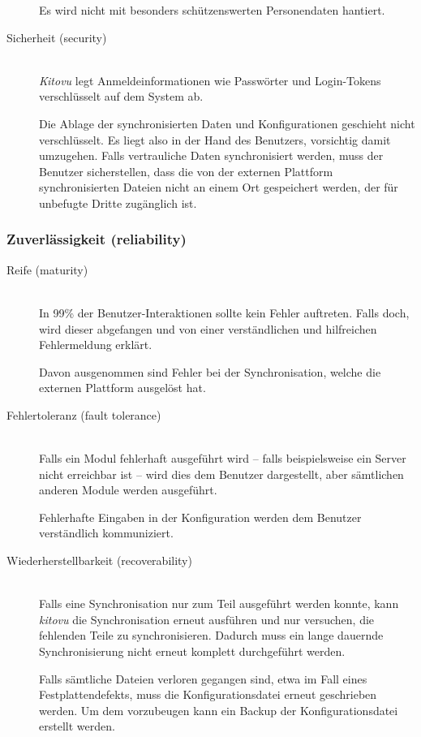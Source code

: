 \documentclass[a4paper]{article}
\begin{document}
\begin{description}
    Es wird nicht mit besonders schützenswerten Personendaten hantiert.
  \item[Sicherheit (security)] \strut \\
    \emph{Kitovu} legt Anmeldeinformationen wie Passwörter und Login-Tokens verschlüsselt auf dem System ab.

    Die Ablage der synchronisierten Daten und Konfigurationen geschieht nicht verschlüsselt. Es liegt also in der Hand des Benutzers, vorsichtig damit umzugehen.
    Falls vertrauliche Daten synchronisiert werden, muss der Benutzer sicherstellen, dass die von der externen Plattform synchronisierten Dateien nicht an einem Ort gespeichert werden, der für unbefugte Dritte zugänglich ist.
\end{description}

\subsubsection{Zuverlässigkeit (reliability)}

\begin{description}
  \item[Reife (maturity)] \strut \\
    In 99\% der Benutzer-Interaktionen sollte kein Fehler auftreten.
    Falls doch, wird dieser abgefangen und von einer verständlichen und hilfreichen Fehlermeldung erklärt.

    Davon ausgenommen sind Fehler bei der Synchronisation, welche die externen Plattform ausgelöst hat.
  \item[Fehlertoleranz (fault tolerance)] \strut \\
    Falls ein Modul fehlerhaft ausgeführt wird -- falls beispielsweise ein Server nicht erreichbar ist -- wird dies dem Benutzer dargestellt, aber sämtlichen anderen Module werden ausgeführt.

    Fehlerhafte Eingaben in der Konfiguration werden dem Benutzer verständlich kommuniziert.
  \item[Wiederherstellbarkeit (recoverability)] \strut \\
    Falls eine Synchronisation nur zum Teil ausgeführt werden konnte, kann \emph{kitovu} die Synchronisation erneut ausführen und nur versuchen, die fehlenden Teile zu synchronisieren.
    Dadurch muss ein lange dauernde Synchronisierung nicht erneut komplett durchgeführt werden.

    Falls sämtliche Dateien verloren gegangen sind, etwa im Fall eines Festplattendefekts, muss die Konfigurationsdatei erneut geschrieben werden. Um dem vorzubeugen kann ein Backup der Konfigurationsdatei erstellt werden. 
\end{description}
\end{document}

